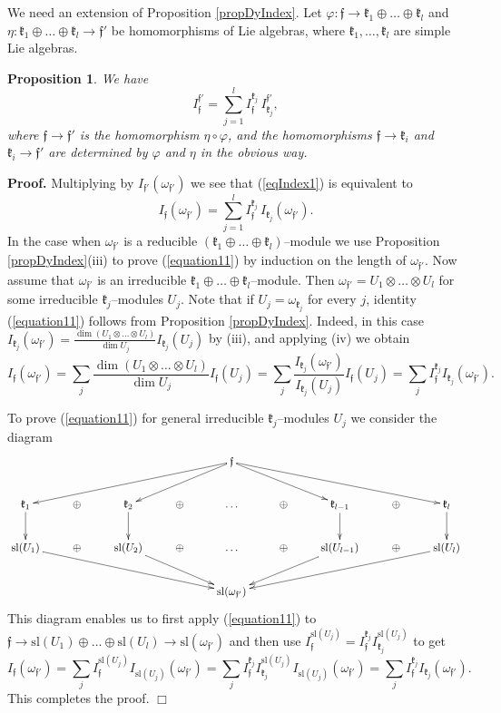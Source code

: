 \documentclass[oneside,leqno,12pt]{article}
\newcounter{theorem}
\newtheorem{prop}[theo]{Proposition}
\newenvironment{proof}{ \noindent \textbf{Proof.}}{\hfill $\Box$}
\def\gf{\mathfrak{f}}
\def\gk{\mathfrak{k}}
\newcommand{\kk}{\mathfrak{k}}
\renewcommand {\phi} {\varphi}
\newcommand{\refprop}[1]{Proposition \ref{#1}}
\newcommand{\refeq}[1]{(\ref{#1})}
\renewcommand{\sl}{\mathrm{sl}}
\begin{document}
We need an extension of Proposition \ref{propDyIndex}. Let $\phi:\gf\to\kk_1\oplus\dots\oplus\kk_l$ and $\eta:\kk_1\oplus\dots\oplus\kk_l\to\gf'$ be  homomorphisms of Lie algebras, where $\kk_1,\dots,\kk_l$ are simple Lie algebras. 

\begin{prop}\label{propIndex1} We have
\begin{equation}\label{eqIndex1}
I_\gf^{\gf'}=\sum_{j=1}^{l} I_\gf^{\kk_j} \, I_{\kk_j}^{\gf'},
\end{equation}
where $\gf \to \gf'$ is the homomorphism $\eta \circ \phi$, and 
the homomorphisms $\gf \to \gk_i$ and $\gk_i \to \gf'$ are determined by $\phi$ and $\eta$ in the obvious way.
\end{prop}

\begin{proof} 
Multiplying by $I_{\gf'}(\omega_{\gf'})$ we see that (\ref{eqIndex1}) is equivalent to
\begin{equation}\label{equation11}
I_\gf(\omega_{\gf'})=\sum_{j=1}^{l} I_\gf^{\kk_j} \, I_{\kk_j}(\omega_{\gf'}).
\end{equation}
In the case when $\omega_{\gf'}$ is a reducible $(\gk_1 \oplus \dots \oplus \gk_l)$--module we use Proposition \ref{propDyIndex}(iii)
to prove (\ref{equation11}) by induction on the length of $\omega_{\gf'}$.
Now assume that $\omega_{\gf'}$ is an irreducible $\kk_1\oplus\dots\oplus\kk_l$--module. 
Then $\omega_{\gf'}=U_1\otimes\dots \otimes U_l$ for some irreducible $\kk_j$--modules $U_j$. 
Note that if $U_j = \omega_{\gk_j}$  for every $j$, identity \refeq{equation11} follows from \refprop{propDyIndex}. 
Indeed, in this case $I_{\kk_j}(\omega_{\gf'})=\frac{\dim(U_1\otimes\dots\otimes U_l)}{\dim U_j} I_{\gk_j}(U_j)$ by (iii), 
and applying (iv) we obtain
$$
I_\gf(\omega_{\gf'})=\sum_j\frac{\dim(U_1\otimes\dots\otimes U_l)}{\dim U_j}I_\gf(U_j) = \sum_j \frac{I_{\gk_j}(\omega_{\gf'})}{I_{\gk_j}(U_j)} I_\gf(U_j)
= \sum_j I_\gf^{\gk_j} I_{\kk_j}(\omega_{\gf'}).
$$

To prove (\ref{equation11}) for general irreducible $\gk_j$--modules $U_j$
we consider the diagram
$$
\xymatrix{
& & & & \gf\ar[lllld]\ar[lld]\ar[rrd]\ar[rrrrd] & & & & \\
\gk_1\ar[d]& \oplus & \gk_2\ar[d] & \oplus & \dots & \oplus & \gk_{l-1}\ar[d] & \oplus & \gk_l\ar[d]\\
\sl(U_1)\ar[drrrr]& \oplus & \sl(U_2)\ar[drr] & \oplus & \dots & \oplus & \sl(U_{l-1})\ar[dll] & \oplus & \sl(U_l)\ar[dllll]\\
& & & & \sl(\omega_{\gf'}) & & & &
} 
$$
This diagram enables us to first apply  (\ref{equation11}) to $\gf \to \sl(U_1) \oplus \dots \oplus \sl(U_l) \to \sl(\omega_{\gf'})$ and then
use $I_\gf^{\sl(U_j)} =  I_\gf^{\kk_j}I_{\kk_j}^{\sl(U_j)}$ to get
\[
I_\gf(\omega_{\gf'})=\sum_j I_\gf^{\sl(U_j)}I_{\sl(U_j)}(\omega_{\gf'})=\sum_j I_\gf^{\kk_j}I_{\kk_j}^{\sl(U_j)}I_{\sl(U_j)}(\omega_{\gf'})=\sum_jI_\gf^{\kk_j}I_{\kk_j}(\omega_{\gf'}).
\]
This completes the proof.
\end{proof}
\end{document}
